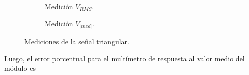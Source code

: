       \begin{figure}[H]
        \centering
        \begin{subfigure}[ht]{0.48\textwidth}
          \caption{Medición $V_{RMS}$.}
          \label{fig:MedicionVrmsTriangular}
        \end{subfigure}
        \hfill 
        \begin{subfigure}[ht]{0.48\textwidth}
          \caption{Medición $V_{|med|}$.}
          \label{fig:MedicionVmedTriangular}
        \end{subfigure}
        \caption{Mediciones de la señal triangular.}
         \label{fig:MedicionSeñalTriangular}
      \end{figure}

      Luego, el error porcentual para el multímetro de respuesta al 
      valor medio del módulo es

